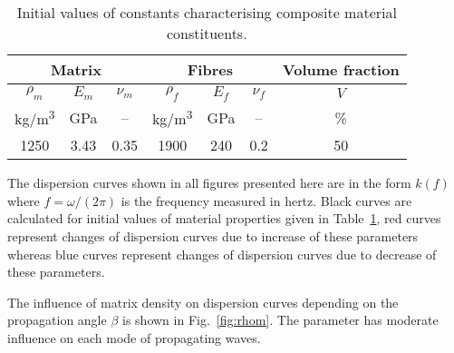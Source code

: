 \documentclass[preprint,12pt]{elsarticle}
\begin{document}
 \begin{table}[h]
 	\renewcommand{\arraystretch}{1.3}
 	\centering \footnotesize
 	\caption{Initial values of constants characterising composite material constituents.}
 	\begin{tabular}{ccccccc} 
 		\toprule
 		\multicolumn{3}{c}{\textbf{Matrix} }	& \multicolumn{3}{c}{\textbf{Fibres} } & \textbf{Volume fraction}	 \\ 
 		\midrule
 		$\rho_m$ & $E_m$ & $\nu_m$  & $\rho_f$ & $E_f$ & $\nu_f$ & $V$\\
 		kg/m\textsuperscript{3} &GPa& --  & kg/m\textsuperscript{3}  & GPa& -- & \%\\ 
 		\cmidrule(lr){1-3} \cmidrule(lr){4-6} \cmidrule(lr){7-7}
 		1250 &3.43& 0.35& 1900 & 240 & 0.2 & 50\\
 		\bottomrule 
 	\end{tabular} 
 	\label{tab:matprop}
 \end{table}
 
 The dispersion curves shown in all figures presented here are in the form $k(f)$ where $f=\omega/(2 \pi)$ is the frequency measured in hertz. Black curves are calculated for initial values of material properties given in Table~\ref{tab:matprop}, red curves represent changes of dispersion curves due to increase of these parameters whereas blue curves represent changes of dispersion curves due to decrease of these parameters.
 
 The influence of matrix density on dispersion curves depending on the propagation angle $\beta$ is shown in Fig.~\ref{fig:rhom}. The parameter has moderate influence on each mode of propagating waves.
 
\end{document}
